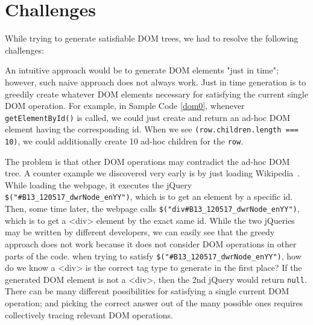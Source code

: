 \section{Challenges}
While trying to generate satisfiable DOM trees, we had to resolve the following challenges:  

An intuitive approach would be to generate DOM elements "just in time"; however, such naive approach does not always work.  
Just in time generation is to greedily create whatever DOM elements necessary for satisfying the current single DOM operation.  
For example, in Sample Code \ref{dom0}, whenever {\tt getElementById()} is called, we could just create and return an ad-hoc DOM element having the corresponding id.  
When we see {\tt (row.children.length === 10)}, we could additionally create 10 ad-hoc children for the {\tt row}.  

The problem is that other DOM operations may contradict the ad-hoc DOM tree.  
A counter example we discovered very early is by just loading Wikipedia~\cite{wikipedia}.  
While loading the webpage, it executes the jQuery {\tt \$("\#B13\_120517\_dwrNode\_enYY")}, which is to get an element by a specific id.  
Then, some time later, the webpage calls {\tt \$("div\#B13\_120517\_dwrNode\_enYY")}, which is to get a <div> element by the exact same id.  
While the two jQueries may be written by different developers, we can easily see that the greedy approach does not work because it does not consider DOM operations in other parts of the code.
when trying to satisfy {\tt \$("\#B13\_120517\_dwrNode\_enYY")}, how do we know a <div> is the correct tag type to generate in the first place?  
If the generated DOM element is not a <div>, then the 2nd jQuery would return {\tt null}.  
There can be many different possibilities for satisfying a single current DOM operation; and picking the correct answer out of the many possible ones requires collectively tracing relevant DOM operations.  


